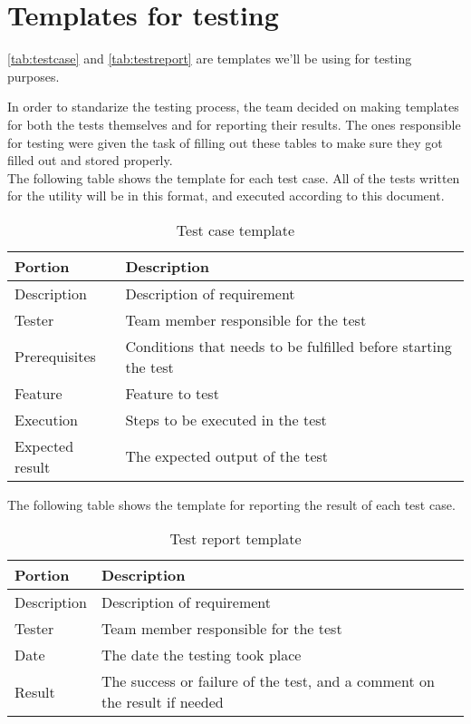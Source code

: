 \section{Templates for testing}
\autoref{tab:testcase} and \autoref{tab:testreport} are templates we'll be
using for testing purposes.

In order to standarize the testing process, the team decided on making templates for both the tests themselves and for reporting their results. The ones responsible for testing were given the task of filling out these tables to make sure they got filled out and stored properly.\\[0.5ex]

The following table shows the template for each test case. All of the tests written for the utility will be in this format, and executed according to this document.\\[0.5ex]

\begin{table}[ht] \small \center
\caption{Test case template \label{tab:testcase}}
\begin{tabular}{l l}
	\toprule
	Portion & Description \\
	\midrule
	Description & Description of requirement \\
	Tester & Team member responsible for the test \\
	Prerequisites & Conditions that needs to be fulfilled before starting the test \\
	Feature & Feature to test \\
	Execution & Steps to be executed in the test \\
	Expected result & The expected output of the test \\
	\bottomrule
\end{tabular}
\end{table}

The following table shows the template for reporting the result of each test case.\\[0.5ex]

\begin{table}[ht] \small \center
\caption{Test report template \label{tab:testreport}}
\begin{tabular}{l l}
	\toprule
	Portion & Description \\
	\midrule
	Description & Description of requirement \\
	Tester & Team member responsible for the test \\
	Date & The date the testing took place \\
	Result & The success or failure of the test, and a comment on the result if needed \\
	\bottomrule
\end{tabular}
\end{table}

